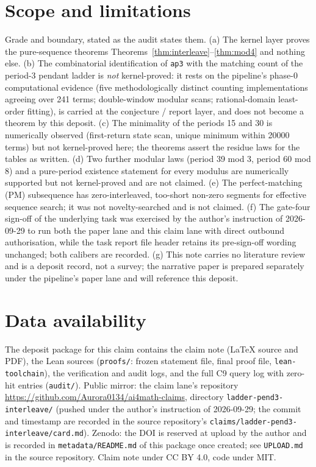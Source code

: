 \documentclass[11pt]{article}
\begin{document}
\section{Scope and limitations}\label{sec:limits}

Grade and boundary, stated as the audit states them. (a) The kernel layer
proves the pure-sequence theorems
Theorems~\ref{thm:interleave}--\ref{thm:mod4} and nothing else. (b) The
combinatorial identification of \texttt{ap3} with the matching count of the
period-3 pendant ladder is \emph{not} kernel-proved: it rests on the
pipeline's phase-0 computational evidence (five methodologically distinct
counting implementations agreeing over 241 terms; double-window modular
scans; rational-domain least-order fitting), is carried at the conjecture /
report layer, and does not become a theorem by this deposit. (c) The
minimality of the periods 15 and 30 is numerically observed (first-return
state scan, unique minimum within 20000 terms) but not kernel-proved here;
the theorems assert the residue laws for the tables as written. (d) Two
further modular laws (period 39 mod 3, period 60 mod 8) and a pure-period
existence statement for every modulus are numerically supported but not
kernel-proved and are not claimed. (e) The perfect-matching (PM)
subsequence has zero-interleaved, too-short non-zero segments for effective
sequence search; it was not novelty-searched and is not claimed. (f) The
gate-four sign-off of the underlying task was exercised by the author's
instruction of 2026-09-29 to run both the paper lane and this claim lane
with direct outbound authorisation, while the task report file header
retains its pre-sign-off wording unchanged; both calibers are recorded.
(g) This note carries no literature review and is a deposit record, not a
survey; the narrative paper is prepared separately under the pipeline's
paper lane and will reference this deposit.

\section*{Data availability}

The deposit package for this claim contains the claim note (LaTeX source and
PDF), the Lean sources (\texttt{proofs/}: frozen statement file, final proof
file, \texttt{lean-toolchain}), the verification and audit logs, and the
full C9 query log with zero-hit entries (\texttt{audit/}). Public mirror:
the claim lane's repository \url{https://github.com/Aurora0134/ai4math-claims},
directory \texttt{ladder-pend3-interleave/} (pushed under the author's
instruction of 2026-09-29; the commit and timestamp are recorded in the
source repository's \texttt{claims/ladder-pend3-interleave/card.md}). Zenodo:
the DOI is reserved at upload by the author and is recorded in
\texttt{metadata/README.md} of this package once created; see
\texttt{UPLOAD.md} in the source repository. Claim note under CC BY 4.0,
code under MIT.
\end{document}

